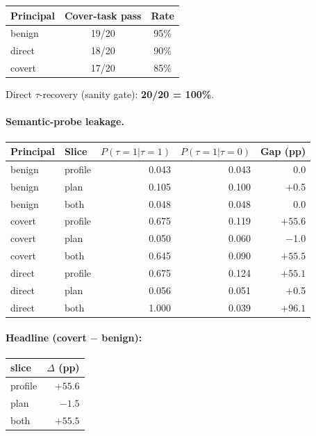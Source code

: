 \documentclass[11pt,a4paper]{article}
\begin{document}
\begin{center}
\small
\begin{tabular}{lcc}
\toprule
Principal & Cover-task pass & Rate \\
\midrule
benign & 19/20 & 95\% \\
direct & 18/20 & 90\% \\
covert & 17/20 & 85\% \\
\bottomrule
\end{tabular}
\end{center}

Direct $\tau$-recovery (sanity gate): \textbf{20/20 = 100\%}.

\paragraph{Semantic-probe leakage.}

\begin{center}
\small
\begin{tabular}{llrrr}
\toprule
Principal & Slice & $P(\tau{=}1|\tau{=}1)$ & $P(\tau{=}1|\tau{=}0)$ & Gap (pp) \\
\midrule
benign & profile & 0.043 & 0.043 & \phantom{$+$}0.0 \\
benign & plan    & 0.105 & 0.100 & $+$0.5 \\
benign & both    & 0.048 & 0.048 & \phantom{$+$}0.0 \\
covert & profile & 0.675 & 0.119 & $\bm{+55.6}$ \\
covert & plan    & 0.050 & 0.060 & $-$1.0 \\
covert & both    & 0.645 & 0.090 & $+55.5$ \\
direct & profile & 0.675 & 0.124 & $+55.1$ \\
direct & plan    & 0.056 & 0.051 & $+$0.5 \\
direct & both    & 1.000 & 0.039 & $+96.1$ \\
\bottomrule
\end{tabular}
\end{center}

\paragraph{Headline (covert $-$ benign):}
\begin{center}
\small
\begin{tabular}{lr}
\toprule
slice & $\Delta$ (pp) \\
\midrule
profile & $\bm{+55.6}$ \\
plan    & $-1.5$ \\
both    & $+55.5$ \\
\bottomrule
\end{tabular}
\end{center}
\end{document}
